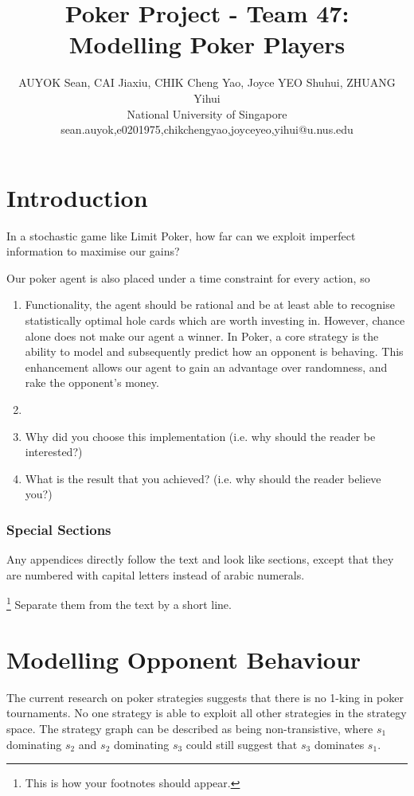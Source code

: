 \documentclass{article}
\title{Poker Project - Team 47: Modelling Poker Players}
\author{
AUYOK Sean, CAI Jiaxiu, CHIK Cheng Yao, Joyce YEO Shuhui, ZHUANG Yihui
\\ 
National University of Singapore\\
%
sean.auyok,e0201975,chikchengyao,joyceyeo,yihui@u.nus.edu
}
\begin{document}
\maketitle

\section{Introduction}

In a stochastic game like Limit Poker, how far can we exploit imperfect information to maximise our gains? 

Our poker agent is also placed under a time constraint for every action, so 

\begin{enumerate}
	\item Functionality, the agent should be rational and be at least able to recognise statistically optimal hole cards which are worth investing in. However, chance alone does not make our agent a winner. In Poker, a core strategy is the ability to model and subsequently predict how an opponent is behaving. This enhancement allows our agent to gain an advantage over randomness, and rake the opponent's money.
	
	\item
	\item Why did you choose this implementation (i.e. why should the reader be interested?)
	\item What is the result that you achieved? (i.e. why should the reader believe you?)
\end{enumerate}


\subsubsection{Special Sections}

Any appendices directly follow the text and look like sections, except
that they are numbered with capital letters instead of arabic
numerals.

\footnote{This is how your footnotes should appear.} Separate them from the text by a short line.

\section{Modelling Opponent Behaviour}

The current research on poker strategies suggests that there is no 1-king in poker tournaments. No one strategy is able to exploit all other strategies in the strategy space. The strategy graph can be described as being non-transistive, where $s_1$ dominating $s_2$ and $s_2$ dominating $s_3$ could still suggest that $s_3$ dominates $s_1$.
\end{document}
